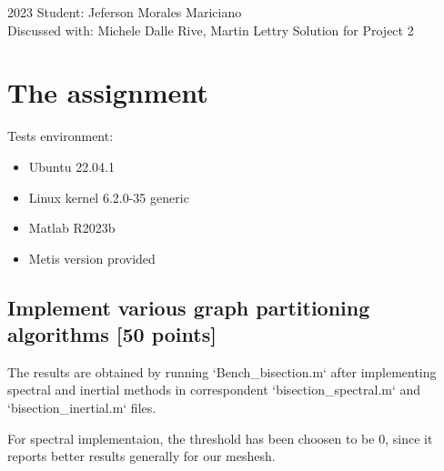 \documentclass[unicode,11pt,a4paper,oneside,numbers=endperiod,openany]{scrartcl}
\begin{document}
\setassignment
{}

{2023}
{Student: Jeferson Morales Mariciano \\}
{Discussed with: Michele Dalle Rive, Martin Lettry}
{Solution for Project 2}{}
\newline

\assignmentpolicy

\newpage

\section{The assignment}

Tests environment:
\begin{itemize}
    \item Ubuntu 22.04.1
    \item Linux kernel 6.2.0-35 generic
    \item Matlab R2023b
    \item Metis version provided
\end{itemize}

\subsection{Implement various graph partitioning algorithms [50 points]}

The results are obtained by running `Bench\_bisection.m` after implementing spectral and inertial methods in
correspondent `bisection\_spectral.m` and `bisection\_inertial.m` files.

For spectral implementaion, the threshold has been choosen to be $0$, since it reports better results generally for our meshesh. \\
\end{document}
